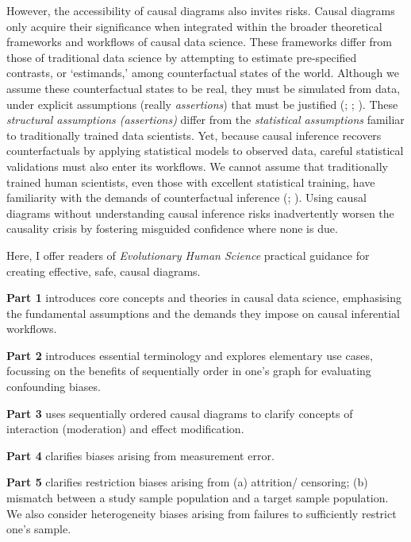 \documentclass[
  singlecolumn]{article}
\begin{document}
However, the accessibility of causal diagrams also invites risks. Causal
diagrams only acquire their significance when integrated within the
broader theoretical frameworks and workflows of causal data science.
These frameworks differ from those of traditional data science by
attempting to estimate pre-specified contrasts, or `estimands,' among
counterfactual states of the world. Although we assume these
counterfactual states to be real, they must be simulated from data,
under explicit assumptions (really \emph{assertions}) that must be
justified (;
;
). These
\emph{structural assumptions (assertions)} differ from the
\emph{statistical assumptions} familiar to traditionally trained data
scientists. Yet, because causal inference recovers counterfactuals by
applying statistical models to observed data, careful statistical
validations must also enter its workflows. We cannot assume that
traditionally trained human scientists, even those with excellent
statistical training, have familiarity with the demands of
counterfactual inference (; ). Using
causal diagrams without understanding causal inference risks
inadvertently worsen the causality crisis by fostering misguided
confidence where none is due.

Here, I offer readers of \emph{Evolutionary Human Science} practical
guidance for creating effective, safe, causal diagrams.

\textbf{Part 1} introduces core concepts and theories in causal data
science, emphasising the fundamental assumptions and the demands they
impose on causal inferential workflows.

\textbf{Part 2} introduces essential terminology and explores elementary
use cases, focussing on the benefits of sequentially order in one's
graph for evaluating confounding biases.

\textbf{Part 3} uses sequentially ordered causal diagrams to clarify
concepts of interaction (moderation) and effect modification.

\textbf{Part 4} clarifies biases arising from measurement error.

\textbf{Part 5} clarifies restriction biases arising from (a) attrition/
censoring; (b) mismatch between a study sample population and a target
sample population. We also consider heterogeneity biases arising from
failures to sufficiently restrict one's sample.
\end{document}

